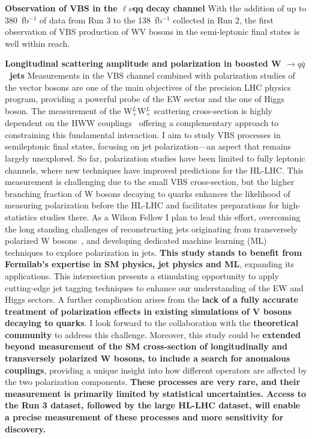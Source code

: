 {\begin{flushleft}
\textbf{Observation of VBS in the $\ell\nu$qq decay channel} With the addition of up to 380~fb$^{-1}$ of data from Run 3 to the 138~fb$^{-1}$ collected in Run 2, the first observation of VBS production of WV bosons in the semi-leptonic final states is well within reach.

\textbf{Longitudinal scattering amplitude and polarization in boosted W $\to q\bar{q}$ \ jets}
Measurements in the VBS channel combined with polarization studies of the vector bosons are one of the main objectives of the precision LHC physics program, providing a powerful probe of the EW sector and the one of Higgs boson.
The measurement of the  W$^L_+$W$^L_+$ scattering cross-section is highly dependent on the HWW couplings~\cite{[4]} offering a complementary approach to constraining this fundamental interaction.
I aim to study VBS processes in semileptonic final states, focusing on jet polarization—an aspect that remains largely unexplored. So far, polarization studies have been limited to fully leptonic channels, where new techniques have improved predictions for the HL-LHC. This measurement is challenging due to the small VBS cross-section, but the higher branching fraction of W bosons decaying to quarks enhances the likelihood of measuring polarization before the HL-LHC and facilitates preparations for high-statistics studies there. As a Wilson Fellow I plan to lead this effort, overcoming the long standing challenges of reconstructing jets originating from transversely polarized W bosons~\cite{[5]}, and developing dedicated machine learning (ML) techniques to explore polarization in jets.
\textbf{This study stands to benefit from Fermilab’s expertise in SM physics, jet physics and ML}, expanding its applications. This intersection presents a stimulating opportunity to apply cutting-edge jet tagging techniques to enhance our understanding of the EW and Higgs sectors.
A further complication arises from the {\bf lack of a fully accurate treatment of polarization effects in existing simulations of V bosons decaying to quarks}. I look forward to the collaboration with the {\bf theoretical community} to address this challenge.  
Moreover, this study could be {\bf extended beyond measurement of the SM cross-section of longitudinally and transversely polarized W bosons, to include a search for anomalous couplings}, providing a unique insight into how different operators are affected by the two polarization components.
{\bf These processes are very rare, and their measurement is primarily limited by statistical uncertainties. Access to the Run 3 dataset, followed by the large HL-LHC dataset, will enable a precise measurement of these processes and more sensitivity for discovery.}


\end{flushleft}}
